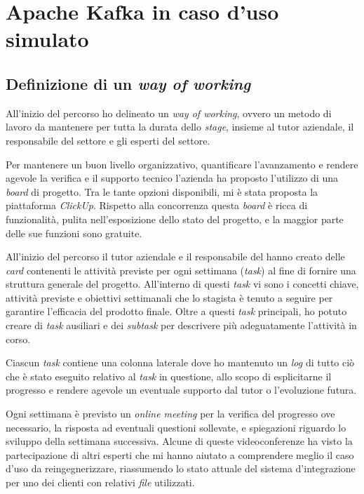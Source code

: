 \chapter{Apache Kafka in caso d’uso simulato}

\section{Definizione di un \textit{way of working}}

All'inizio del percorso ho delineato un \textit{way of working}, ovvero un metodo di lavoro da mantenere per tutta la durata dello \textit{stage}, insieme al tutor aziendale, il responsabile del settore  e gli esperti del settore.

Per mantenere un buon livello organizzativo, quantificare l'avanzamento e rendere agevole la verifica e il supporto tecnico l'azienda ha proposto l'utilizzo di una \textit{board} di progetto.
Tra le tante opzioni disponibili, mi è stata proposta la piattaforma \textit{ClickUp}.
Rispetto alla concorrenza questa \textit{board} è ricca di funzionalità, pulita nell'esposizione dello stato del progetto, e la maggior parte delle sue funzioni sono gratuite.

All'inizio del percorso il tutor aziendale e il responsabile del  hanno creato delle \textit{card} contenenti le attività previste per ogni settimana (\textit{task}) al fine di fornire una struttura generale del progetto.
All'interno di questi \textit{task} vi sono i concetti chiave, attività previste e obiettivi settimanali che lo stagista è tenuto a seguire per garantire l'efficacia del prodotto finale.
Oltre a questi \textit{task} principali, ho potuto creare di \textit{task} ausiliari e dei \textit{subtask} per descrivere più adeguatamente l'attività in corso.

Ciascun \textit{task} contiene una colonna laterale dove ho mantenuto un \textit{log} di tutto ciò che è stato eseguito relativo al \textit{task} in questione, allo scopo di esplicitarne il progresso e rendere agevole un eventuale supporto dal tutor o l'evoluzione futura.

Ogni settimana è previsto un \textit{online meeting} per la verifica del progresso ove necessario, la risposta ad eventuali questioni sollevate, e spiegazioni riguardo lo sviluppo della settimana successiva.
Alcune di queste videoconferenze ha visto la partecipazione di altri esperti che mi hanno aiutato a comprendere meglio il caso d'uso da reingegnerizzare, riassumendo lo stato attuale del sistema d'integrazione per uno dei clienti con relativi \textit{file} utilizzati.

